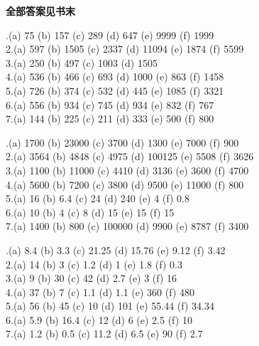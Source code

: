 \documentclass[a4paper,12pt]{ctexart}
\begin{document}
\bigskip

\begin{center}
  \textbf{\large 全部答案见书末}
\end{center}

\newpage


.(a) 75 \quad (b) 157 \quad (c) 289 \quad (d) 647 \quad (e) 9999 \quad (f) 1999 \\
2.(a) 597 \quad (b) 1505 \quad (c) 2337 \quad (d) 11094 \quad (e) 1874 \quad (f) 5599 \\
3.(a) 250 \quad (b) 497 \quad (c) 1003 \quad (d) 1505 \\
4.(a) 536 \quad (b) 466 \quad (c) 693 \quad (d) 1000 \quad (e) 863 \quad (f) 1458 \\
5.(a) 726 \quad (b) 374 \quad (c) 532 \quad (d) 445 \quad (e) 1085 \quad (f) 3321 \\
6.(a) 556 \quad (b) 934 \quad (c) 745 \quad (d) 934 \quad (e) 832 \quad (f) 767 \\
7.(a) 144 \quad (b) 225 \quad (c) 211 \quad (d) 333 \quad (e) 500 \quad (f) 800

.(a) 1700 \quad (b) 23000 \quad (c) 3700 \quad (d) 1300 \quad (e) 7000 \quad (f) 900 \\
2.(a) 3564 \quad (b) 4848 \quad (c) 4975 \quad (d) 100125 \quad (e) 5508 \quad (f) 3626 \\
3.(a) 1100 \quad (b) 11000 \quad (c) 4410 \quad (d) 3136 \quad (e) 3600 \quad (f) 4700 \\
4.(a) 5600 \quad (b) 7200 \quad (c) 3800 \quad (d) 9500 \quad (e) 11000 \quad (f) 800 \\
5.(a) 16 \quad (b) 6.4 \quad (c) 24 \quad (d) 240 \quad (e) 4 \quad (f) 0.8 \\
6.(a) 10 \quad (b) 4 \quad (c) 8 \quad (d) 15 \quad (e) 15 \quad (f) 15 \\
7.(a) 1400 \quad (b) 800 \quad (c) 100000 \quad (d) 9900 \quad (e) 8787 \quad (f) 3400

.(a) 8.4 \quad (b) 3.3 \quad (c) 21.25 \quad (d) 15.76 \quad (e) 9.12 \quad (f) 3.42 \\
2.(a) 14 \quad (b) 3 \quad (c) 1.2 \quad (d) 1 \quad (e) 1.8 \quad (f) 0.3 \\
3.(a) 9 \quad (b) 30 \quad (c) 42 \quad (d) 2.7 \quad (e) 3 \quad (f) 16 \\
4.(a) 37 \quad (b) 7 \quad (c) 1.1 \quad (d) 1.1 \quad (e) 360 \quad (f) 480 \\
5.(a) 56 \quad (b) 45 \quad (c) 10 \quad (d) 101 \quad (e) 55.44 \quad (f) 34.34 \\
6.(a) 5.9 \quad (b) 16.4 \quad (c) 12 \quad (d) 6 \quad (e) 2.5 \quad (f) 10 \\
7.(a) 1.2 \quad (b) 0.5 \quad (c) 11.2 \quad (d) 6.5 \quad (e) 90 \quad (f) 2.7
\end{document}
